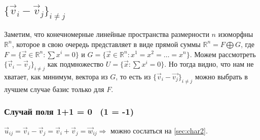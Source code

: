 \subsection{$\{\vec{v}_i - \vec{v}_j\}_{i \neq j}$}
Заметим, что конечномерные линейные пространства размерности $n$ изоморфны $\mathbb{R}^n$, которое в свою очередь представляет в виде прямой суммы $\mathbb{R}^n = F \bigoplus G$, где $F = \{\vec{x} \in \mathbb{R}^n : \sum x^i = 0\}$ и $G = \{\vec{x} \in \mathbb{R}^n : x^1 = x^2 = \ldots = x^n\}$.
Можем рассмотреть $\{\vec{v}_i - \vec{v}_j\}_{i \neq j}$ как подмножество $U = \{\vec{x} : \sum x^i = 0\}$. Но тогда видно, что нам не хватает, как минимум, вектора из $G$, то есть из $\{\vec{v}_i - \vec{v_j}\}_{i \neq j}$ можно выбрать в лучшем случае базис только для $F$.

\subsubsection{Случай поля 1+1 = 0 \, (1 = -1)}
$\vec{u}_{ij} = \vec{v}_i - \vec{v}_j = \vec{v}_i + \vec{v}_j = \vec{w}_{ij} \Longrightarrow$ можно сослаться на \ref{sec:char2}.